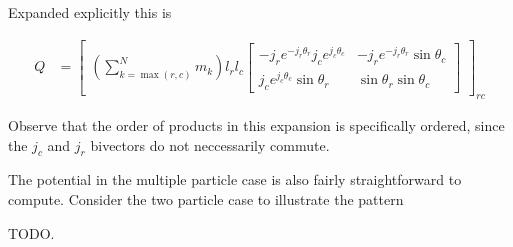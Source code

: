 Expanded explicitly this is

\begin{align}\label{eqn:sPolarMultiPendulum:zoo17}
Q &=
{\begin{bmatrix}
\left(\sum_{k=\max(r,c)}^N m_k \right) l_r l_c
\begin{bmatrix}
- j_r e^{-j_r \theta_r} j_c e^{j_c\theta_c} & - j_r e^{-j_r \theta_r} \sin\theta_c \\
j_c e^{j_c \theta_c} \sin\theta_r & \sin\theta_r \sin\theta_c
\end{bmatrix}
\end{bmatrix}}_{rc}
\end{align}

Observe that the order of products in this expansion is specifically ordered, since the $j_c$ and $j_r$ bivectors do not neccessarily commute.

The potential in the multiple particle case is also fairly straightforward to compute.  Consider the two particle case to illustrate the pattern

TODO.

\EndNoBibArticle
